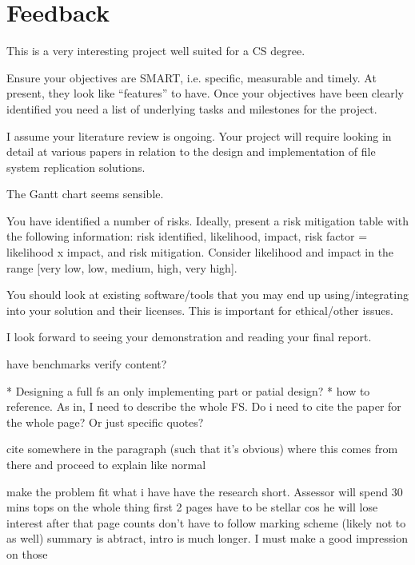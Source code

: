 \documentclass[a4paper]{report}
\begin{document}
    \section{Feedback}
        This is a very interesting project well suited for a CS degree.

        Ensure your objectives are SMART, i.e. specific, measurable and timely.
        At present, they look like “features” to have. Once your objectives
        have been clearly identified you need a list of underlying tasks and
        milestones for the project.

        I assume your literature review is ongoing. Your project will require
        looking in detail at various papers in relation to the design and
        implementation of file system replication solutions.

        The Gantt chart  seems sensible.

        You have identified a number of risks. Ideally, present a risk
        mitigation table with the following information: risk identified,
        likelihood, impact, risk factor = likelihood x impact, and risk
        mitigation. Consider likelihood and impact in the range [very low, low,
        medium, high, very high].

        You should look at existing software/tools that you may end up
        using/integrating into your solution and their licenses. This is
        important for ethical/other issues.

        I look forward to seeing your demonstration and reading your final
        report.

        have benchmarks verify content?



     * Designing a full fs an only implementing part or patial design?
     * how to reference. As in, I need to describe the whole FS. Do i need
       to cite the paper for the whole page? Or just specific quotes?

       cite somewhere in the paragraph (such that it's obvious) where this
       comes from there and proceed to explain like normal

     make the problem fit what i have
     have the research short. Assessor will spend 30 mins tops on the whole thing
     first 2 pages have to be stellar cos he will lose interest after that
     page counts don't have to follow marking scheme (likely not to as well)
     summary is abtract, intro is much longer. I must make a good impression on those
\end{document}
